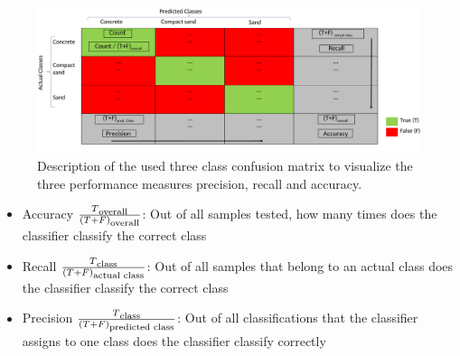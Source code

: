 \documentclass{article}
\begin{document}
\begin{figure}[h]
\centering
\includegraphics[width=\textwidth]{../figures/CM_Description.pdf}
\caption{\label{fig:CMdescrpit}Description of the used three class confusion matrix to visualize the three performance measures precision, recall and accuracy.\cite{kuhr2021}}
\end{figure}
\begin{itemize}
\item Accuracy $\frac{T\textsubscript{overall}}{(T+F)\textsubscript{overall}}$: Out of all samples tested, how many times does the classifier classify the correct class
\item Recall $\frac{T\textsubscript{class}}{(T+F)\textsubscript{actual class}}$: Out of all samples that belong to an actual class does the classifier classify the correct class 
\item Precision $\frac{T\textsubscript{class}}{(T+F)\textsubscript{predicted class}}$: Out of all classifications that the classifier assigns to one class does the classifier classify correctly
\end{itemize}
\end{document}
